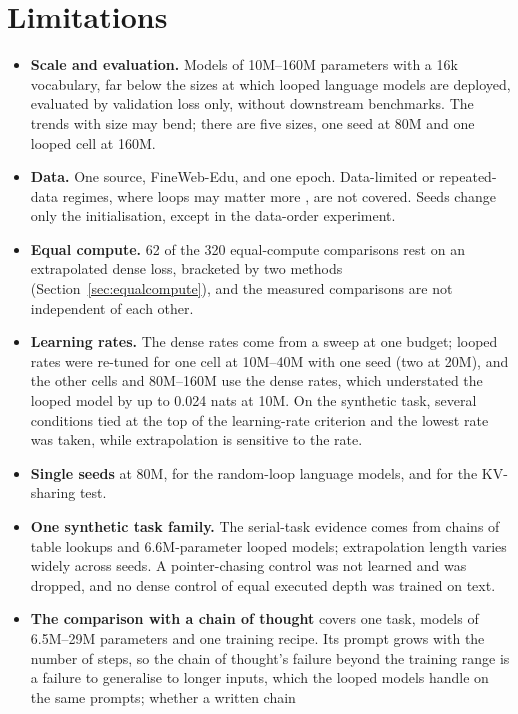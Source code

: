 \section{Limitations}
\label{sec:limitations}

\begin{itemize}
  \item \textbf{Scale and evaluation.} Models of 10M--160M parameters with a 16k vocabulary, far below the sizes at which
  looped language models are deployed, evaluated by validation loss only, without downstream benchmarks. The trends
  with size may bend; there are five sizes, one seed at 80M and one looped cell at 160M.
  \item \textbf{Data.} One source, FineWeb-Edu, and one epoch. Data-limited or repeated-data regimes, where loops may
  matter more \citep{chen2026growth,gulbahar2026squeezing}, are not covered. Seeds change only the initialisation,
  except in the data-order experiment.
  \item \textbf{Equal compute.} 62 of the 320 equal-compute comparisons rest on an extrapolated dense loss, bracketed by
  two methods (Section~\ref{sec:equalcompute}), and the measured comparisons are not independent of each other.
  \item \textbf{Learning rates.} The dense rates come from a sweep at one budget; looped rates were re-tuned for one
  cell at 10M--40M with one seed (two at 20M), and the other cells and 80M--160M use the dense rates, which understated
  the looped model by up to 0.024 nats at 10M. On the synthetic task, several conditions tied at the top of the
  learning-rate criterion and the lowest rate was taken, while extrapolation is sensitive to the rate.
  \item \textbf{Single seeds} at 80M, for the random-loop language models, and for the KV-sharing test.
  \item \textbf{One synthetic task family.} The serial-task evidence comes from chains of table lookups and 6.6M-parameter
  looped models; extrapolation length varies widely across seeds. A pointer-chasing control was not learned and was
  dropped, and no dense control of equal executed depth was trained on text.
  \item \textbf{The comparison with a chain of thought} covers one task, models of 6.5M--29M parameters and one training
  recipe. Its prompt grows with the number of steps, so the chain of thought's failure beyond the training range is a
  failure to generalise to longer inputs, which the looped models handle on the same prompts; whether a written chain

\end{itemize}
